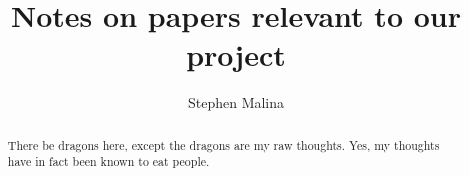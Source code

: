 \documentclass[12pt]{article}
\title{%
\textbf{Notes on papers relevant to our project}
}
\author{
Stephen Malina
}
\begin{document}
\maketitle
\bigskip

\begin{abstract}
    There be dragons here, except the dragons are my raw thoughts. Yes, my thoughts have in fact been known to eat people.
\end{abstract}

\clearpage
\glsresetall{}

\tableofcontents
\pagebreak




\nocite{*}

\clearpage




\clearpage
\appendix

%
\end{document}
